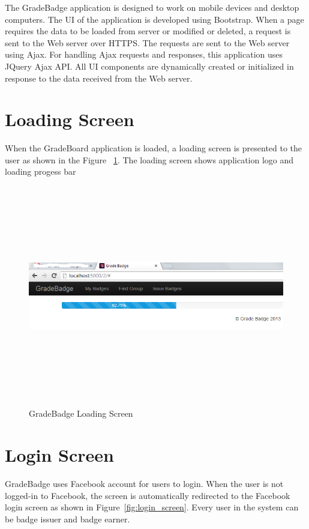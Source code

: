 
The GradeBadge application is designed to work on mobile devices and desktop computers. The UI of the application is developed using Bootstrap. When a page requires the data to be loaded from server or modified or deleted, a request is sent to the Web server over  HTTPS. The requests are sent to the Web server using Ajax. For handling Ajax requests and responses, this application uses JQuery Ajax API. All UI components are dynamically created or initialized in response to the data received from the Web server.

\newpage
\section{Loading Screen}
When the GradeBoard application is loaded, a loading screen is presented to the user as shown in the Figure ~\ref{fig:loading_screen}. The loading screen shows application logo and loading progess bar 

\vspace{3em}
\begin{figure}[H]
\begin{center}
\includegraphics[height=3.8in,width=6.5in]{images/loading-screen.jpg}
\caption{GradeBadge Loading Screen}
\label{fig:loading_screen}
\end{center}
\end{figure}

\newpage
\section{Login Screen}
GradeBadge uses Facebook account for users to login. When the user is not logged-in to Facebook, the screen is automatically redirected to the Facebook login screen as shown in Figure~\ref{fig:login_screen}. Every user in the system can be badge issuer and badge earner.

